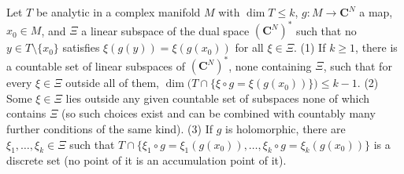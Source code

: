 \begin{lemma}
\label{rem:generic-sections}
\leanok
Let \(T\) be analytic in a complex manifold \(M\) with \(\dim T\le k\), \(g\colon M\to\mathbf C^N\) a map, \(x_0\in M\), and \(\Xi\) a linear subspace of the dual space
\((\mathbf C^N)^*\) such that no \(y\in T\setminus\{x_0\}\) satisfies \(\xi(g(y))=\xi(g(x_0))\) for all \(\xi\in\Xi\).
(1) If \(k\ge1\), there is a countable set of linear subspaces of \((\mathbf C^N)^*\), none containing \(\Xi\), such that for every \(\xi\in\Xi\) outside all of them,
\(\dim\bigl(T\cap\{\xi\circ g=\xi(g(x_0))\}\bigr)\le k-1\).
(2) Some \(\xi\in\Xi\) lies outside any given countable set of subspaces none of which contains \(\Xi\) (so such choices exist and can be combined with countably many
further conditions of the same kind).
(3) If \(g\) is holomorphic, there are \(\xi_1,\dots,\xi_k\in\Xi\) such that \(T\cap\{\xi_1\circ g=\xi_1(g(x_0)),\dots,\xi_k\circ g=\xi_k(g(x_0))\}\) is a discrete set (no point
of it is an accumulation point of it).
\end{lemma}
